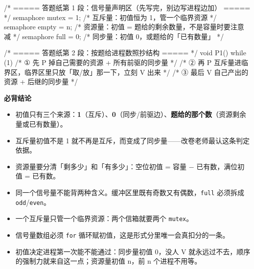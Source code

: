 \documentclass[10pt,a4paper]{ctexart}
\begin{document}
\begin{codebox}
/* ===== 答题纸第 1 段：信号量声明区（先写完，别边写进程边加） ===== */
semaphore mutex  = 1;    /* 互斥量：初值恒为 1，管一个临界资源 */
semaphore empty  = n;    /* 资源量：初值 = 题给的剩余数量，不是容量时要注意减 */
semaphore full   = 0;    /* 同步量：初值 0，或题给的「已有数量」 */

/* ===== 答题纸第 2 段：按题给进程数照抄结构 ===== */
void P1() { while (1) {
    /* ① 先 P 掉自己需要的资源 + 所有前驱的同步量 */
    /* ② 再 P 互斥量进临界区，临界区里只放「取/放」那一下，立刻 V 出来 */
    /* ③ 最后 V 自己产出的资源 + 后继的同步量 */
} }
\end{codebox}




\textbf{必背结论}

\begin{itemize}

\item 初值只有三个来源：\textbf{1}（互斥）、\textbf{0}（同步/前驱边）、\textbf{题给的那个数}（资源剩余量或已有数量）。

\item 互斥量初值不是 1 就不再是互斥，而变成了同步量——改卷老师最认这条判定依据。

\item 资源量要分清「剩多少」和「有多少」：空位初值 = 容量 − 已有数，满位初值 = 已有数。

\item 同一个信号量不能背两种含义。缓冲区里既有奇数又有偶数，\texttt{full} 必须拆成 \texttt{odd}/\texttt{even}。

\item 一个互斥量只管一个临界资源：两个信箱就要两个 \texttt{mutex}。

\item 信号量数组必须 \texttt{for} 循环赋初值，这是形式分里唯一会真扣分的一条。

\item 初值决定进程第一次能不能通过：同步量初值 0，没人 V 就永远过不去，顺序的强制力就来自这一点；资源量初值 n，前 n 个进程不用等。

\end{itemize}
\end{document}
